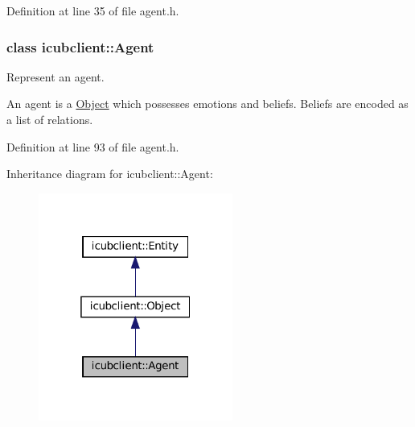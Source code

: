 Definition at line 35 of file agent.\+h.

\label{classicubclient_1_1Agent}
\subsubsection{class icubclient\+:\+:Agent}
Represent an agent. 

An agent is a \hyperlink{group__icubclient__representations_classicubclient_1_1Object}{Object} which possesses emotions and beliefs. Beliefs are encoded as a list of relations. 

Definition at line 93 of file agent.\+h.



Inheritance diagram for icubclient\+:\+:Agent\+:
\nopagebreak
\begin{figure}[H]
\begin{center}
\leavevmode
\includegraphics[width=181pt]{classicubclient_1_1Agent__inherit__graph}
\end{center}
\end{figure}
